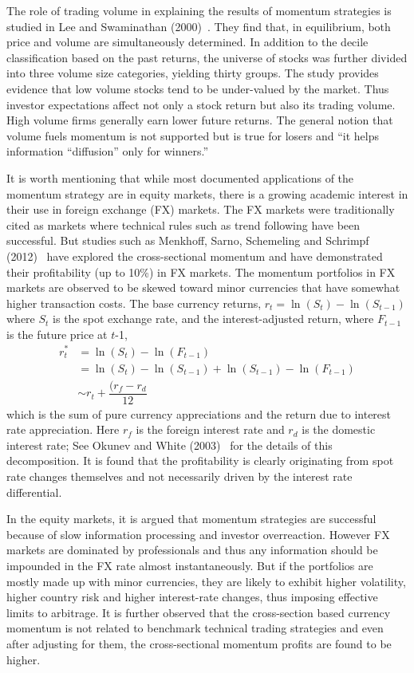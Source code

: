 The role of trading volume in explaining the results of momentum strategies is studied in Lee and Swaminathan (2000)~\cite{lee2000}. They find that, in equilibrium, both price and volume are simultaneously determined. In addition to the decile classification based on the past returns, the universe of stocks was further divided into three volume size categories, yielding thirty groups. The study provides evidence that low volume stocks tend to be under-valued by the market. Thus investor expectations affect not only a stock return but also its trading volume. High volume firms generally earn lower future returns. The general notion that volume fuels momentum is not supported but is true for losers and ``it helps information ``diffusion'' only for winners.''


It is worth mentioning that while most documented applications of the momentum strategy are in equity markets, there is a growing academic interest in their use in foreign exchange (FX) markets. The FX markets were traditionally cited as markets where technical rules such as trend following have been successful. But studies such as Menkhoff, Sarno, Schemeling and Schrimpf (2012)~\cite{menkhoff2012} have explored the cross-sectional momentum and have demonstrated their profitability (up to 10\%) in FX markets. The momentum portfolios in FX markets are observed to be skewed toward minor currencies that have somewhat higher transaction costs. The base currency returns, $r_t= \ln(S_t) - \ln(S_{t-1})$ where $S_t$ is the spot exchange rate, and the interest-adjusted return, where $F_{t-1}$ is the future price at $t$-1,
	\begin{equation}
	\begin{split}
	r_t^* &= \ln(S_t) - \ln(F_{t-1}) \\
	&= \ln(S_t) - \ln(S_{t-1}) + \ln(S_{t-1}) - \ln(F_{t-1}) \\
	&\sim r_t + \dfrac{(r_f - r_d}{12}
	\end{split}
	\end{equation}
which is the sum of pure currency appreciations and the return due to interest rate appreciation. Here $r_f$ is the foreign interest rate and $r_d$ is the domestic interest rate; See Okunev and White (2003)~\cite{okunev2003} for the details of this decomposition. It is found that the profitability is clearly originating from spot rate changes themselves and not necessarily driven by the interest rate differential.


In the equity markets, it is argued that momentum strategies are successful because of slow information processing and investor overreaction. However FX markets are dominated by professionals and thus any information should be impounded in the FX rate almost instantaneously. But if the portfolios are mostly made up with minor currencies, they are likely to exhibit higher volatility, higher country risk and higher interest-rate changes, thus imposing effective limits to arbitrage. It is further observed that the cross-section based currency momentum is not related to benchmark technical trading strategies and even after adjusting for them, the cross-sectional momentum profits are found to be higher.


